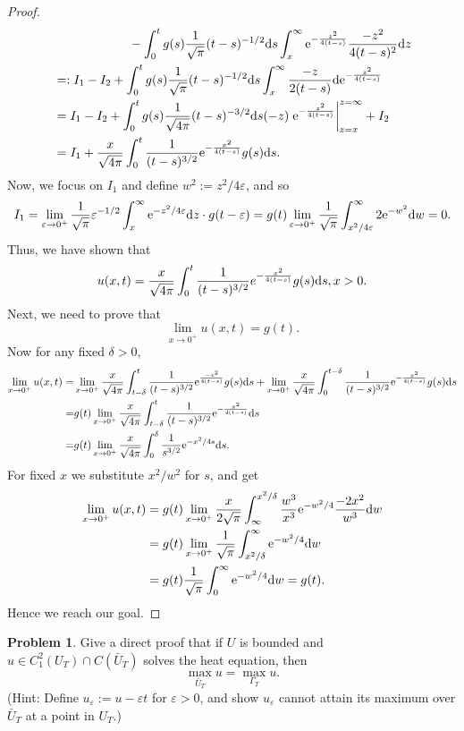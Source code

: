 \documentclass[hyperref,UTF8,12pt]{article}
\numberwithin{equation}{subsection}
\theoremstyle{plain}
\theoremstyle{definition}
\newtheorem{problem}{Problem}
\numberwithin{theorem}{section}
\numberwithin{lemma}{section}
\numberwithin{proposition}{section}
\numberwithin{remark}{section}
\numberwithin{corollary}{section}
\numberwithin{definition}{section}
\numberwithin{problem}{section}
\numberwithin{example}{section}
\def\e{\textup{e}}
\def\dif{\textup{d}}
\newcommand{\ve}{\varepsilon}
\begin{document}
\begin{proof}
\[\begin{aligned}
	&\qquad\qquad\qquad-\int_0^tg(s)\frac{1}{\sqrt{\pi}}(t-s)^{-1/2}\dif s\int_x^\infty \e^{-\frac{z^2}{4(t-s)}}\frac{-z^2}{4(t-s)^2}\dif z\\
	&=:I_1-I_2+\int_0^tg(s)\frac{1}{\sqrt{\pi}}(t-s)^{-1/2}\dif s\int_x ^\infty\frac{-z}{2(t-s)}\dif\e^{-\frac{z^2}{4(t-s)}}\\
	&=I_1-I_2+\int_0^tg(s)\frac{1}{\sqrt{4\pi}}(t-s)^{-3/2}\dif s(-z)\left. \e^{-\frac{z^2}{4(t-s)}}\right|_{z=x}^{z=\infty}+I_2\\
	&=I_1+\frac{x}{\sqrt{4\pi}}\int_0^t\frac{1}{(t-s)^{3/2}}\e^{-\frac{x^2}{4(t-s)}}g(s) \dif s.
\end{aligned}\]Now, we focus on $I_1$ and define $w^2:=z^2/4\ve$, and so \[
I_1=\lim_{\ve\to0^+}\frac{1}{\sqrt{\pi}}\ve^{-1/2}\int_x^\infty\e^{-z^2/4\ve}\dif z\cdot g(t-\ve)=g(t)\lim_{\ve\to0^+}\frac{1}{\sqrt{\pi}}\int_{x^2/4\ve}^\infty2 \e^{-w^2}\dif w=0.\]Thus, we have shown that
\[u(x,t)=\frac{x}{\sqrt{4\pi}}\int_0^t\frac{1}{(t-s)^{3/2}}e^{-\frac{x^2}{4(t-s)}}g(s)\dif s,x>0.\]Next, we need to prove that\[\lim_{x\to0^+}u(x,t)=g(t).\]Now for any fixed $\delta>0$,\[\begin{aligned}
	\lim_{x\to0^+}u(x,t)=&\lim _{x\to0^+}\frac{x}{\sqrt{4\pi}}\int_{t-\delta}^t \frac{1}{(t-s)^{3/2}}\e^{\frac{-x^2}{4(t-s)}}g(s)\dif s+\lim _{x\to0^+}\frac{x}{\sqrt{4\pi}}\int_0^{t-\delta}\frac{1}{(t-s)^{3/2}} \e^{-\frac{x^2}{4(t-s)}}g(s)\dif s\\
	=&g(t)\lim_{x\to0^+}\frac{x}{\sqrt{4 \pi}} \int_{t-\delta}^t \frac{1}{(t-s)^{3/2}} \e^{-\frac{x^2}{4(t-s)}}\dif s\\
	=&g(t)\lim_{x\to0^+}\frac{x}{\sqrt{4\pi}}\int_0^\delta\frac{1}{s^{3/2}} \e^{-x^2/4s}\dif s.
\end{aligned}\]For fixed $x$ we substitute $x^2/w^2$ for $s$, and get\[\begin{aligned}
	\lim_{x\to0^+}u(x,t)&=g(t)\lim_{x\to0^+}\frac{x}{2\sqrt{\pi}}\int_\infty^{x^2/ \delta}\frac{w^3}{x^3}\e^{-w^2/4}\frac{-2x^2}{w^3}\dif w\\
	&=g(t)\lim_{x\to0^+}\frac{1}{\sqrt\pi}\int_{x^2/\delta}^\infty\e^{-w^2/4}\dif w\\
	&=g(t)\frac{1}{\sqrt{\pi}}\int_0^{\infty}\e^{-w^2/4}\dif w=g(t).
\end{aligned}\]Hence we reach our goal.
\end{proof}
\begin{problem}
Give a direct proof that if $U$ is bounded and $u\in C_1^2(U_T)\cap C(\bar{U}_T)$ solves the heat equation, then\[\max_{\bar{U}_T}u=\max_{\Gamma_T}u.\]
(Hint: Define $u_{\ve}:=u-\ve t$ for $\ve>0$, and show $u_{\ve}$ cannot attain its maximum over $\bar{U}_T$ at a point in $U_T$.)
\end{problem}
\end{document}
